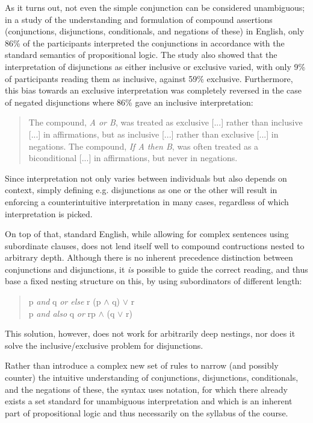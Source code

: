 \documentclass[BA.tex]{subfiles}
\begin{document}
 As it turns out, not even the simple conjunction can be considered 
 unambiguous; in a study\cite{negation} of the understanding and
 formulation of compound assertions (conjunctions, disjunctions, 
 conditionals, and negations of these) in English, only 86\% of the
 participants interpreted the conjunctions in accordance with the
 standard semantics of propositional logic\cite[p.~4]{negation}.
 The study also
 showed that the interpretation of disjunctions as either
 inclusive or exclusive varied, with only 9\% of participants reading
 them as inclusive, against 59\% exclusive\cite[\emph{ibid.}]{negation}.
 Furthermore, this bias towards an exclusive interpretation was completely
 reversed in the case of negated disjunctions where 86\% gave an inclusive
 interpretation:
 \begin{quote}
 The compound, \emph{A or B},
 was treated as exclusive [...] rather than inclusive [...]
 in affirmations, but as inclusive [...] rather than exclusive [...] 
 in negations. The compound, \emph{If A then B}, was
 often treated as a biconditional [...] in affirmations, but
 never in negations.\cite[p.~5]{negation}
 \end{quote}
 Since interpretation not only varies between individuals but also 
 depends on context, simply defining e.g. disjunctions as one or the other
 will result in enforcing a counterintuitive interpretation in many cases,
 regardless of which interpretation is picked.
 
 On top of that, standard English, while allowing for
 complex sentences using subordinate clauses, does not lend itself well to
 compound contructions nested to arbitrary depth. Although there is no 
 inherent precedence distinction between conjunctions and disjunctions, it
 \emph{is} possible to guide the correct reading, and thus base a fixed
 nesting structure on this, by using 
 subordinators of different length:
 \begin{quote}
 \ttfamily
    p \emph{and} q \emph{or else} r \hfill (p \(\land\) q) \(\lor\) r~ \\
    p \emph{and also} q \emph{or} r\hfill p \(\land\) (q \(\lor\) r)
 \end{quote}
 This solution, however, does not work for arbitrarily deep nestings, nor
 does it solve the inclusive/exclusive problem for disjunctions.

 Rather than introduce a complex new set of rules to narrow (and possibly
 counter) the intuitive understanding of conjunctions, disjunctions,
 conditionals, and the negations of these, the syntax uses
  notation, for which there already exists a set standard
 for unambiguous interpretation and which is an inherent part of
 propositional logic and thus necessarily on the syllabus of the course.
\end{document}
